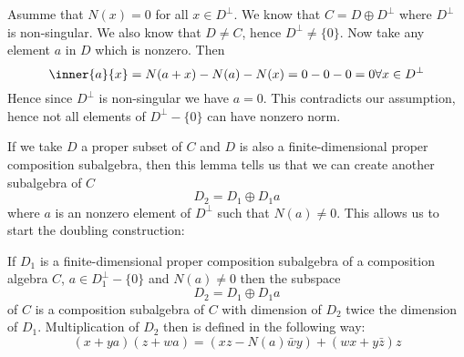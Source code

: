 \documentclass[../Thesis.tex]{subfiles}
\begin{document}
\begin{myproof}
Asumme that $N(x) = 0$ for all $x \in D^\perp$. We know that $C = D \oplus D^\perp$ where $D^\perp$ is non-singular. We also know that $D \neq C$, hence $D^\perp \neq \{ 0 \}$. Now take any element $a$ in $D$ which is nonzero. Then
\begin{equation}
\inner{a}{x} = N(a + x) - N(a) - N(x) = 0 - 0 - 0 = 0 \forall x \in D^\perp
\end{equation}
Hence since $D^\perp$ is non-singular we have $ a= 0$. This contradicts our assumption, hence not all elements of $D^\perp - \{ 0 \}$ can have nonzero norm.
\end{myproof}
If we take $D$ a proper subset of $C$ and $D$ is also a finite-dimensional proper composition subalgebra, then this lemma tells us that we can create another subalgebra of $C$
\begin{equation}
D_2 = D_1 \oplus D_1 a
\end{equation}
where $a$ is an nonzero element of $D^\perp$ such that $N(a) \neq 0$. This allows us to start the doubling construction:
\begin{prop}
If $D_1$ is a finite-dimensional proper composition subalgebra of a composition algebra $C$, $a \in D_1^{\perp} - \{ 0 \}$ and $N(a) \neq 0$ then the subspace 
\begin{equation}
D_2 = D_1 \oplus D_1 a
\end{equation}
of $C$ is a composition subalgebra of $C$ with dimension of $D_2$ twice the dimension of $D_1$. Multiplication of $D_2$ then is defined in the following way:
\begin{equation}
(x + ya)(z + wa) = (xz - N(a)\bar{w} y) + (wx + y \bar{z})z
\end{equation}

\end{prop}
\end{document}
